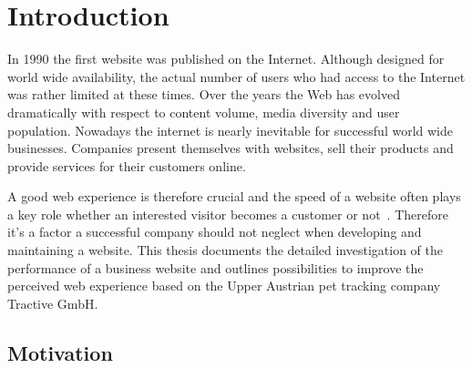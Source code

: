 \chapter{Introduction}
\label{sec:introduction}
In 1990 the first website was published on the Internet. Although designed for world wide availability, the actual number of users who  had access to the Internet was rather limited at these times. Over the years the Web has evolved dramatically with respect to content volume, media diversity and user population. Nowadays  the internet is nearly inevitable for successful world wide businesses. Companies present themselves with websites, sell their products and provide services for their customers online. 

A good web experience is therefore crucial and the speed of a website often plays a key role whether an interested visitor becomes a customer or not~\cite{menasce2000scaling}. 
Therefore it's a factor a successful company should not neglect when developing and maintaining a website. This thesis documents the detailed investigation of the performance of a business website and outlines possibilities to improve the perceived web experience based on the Upper Austrian pet tracking company Tractive GmbH.  

\section{Motivation}

